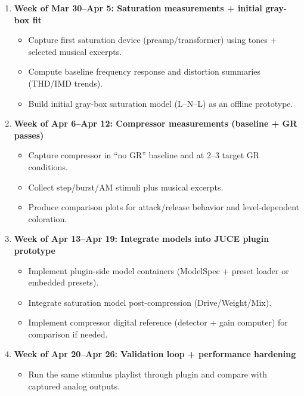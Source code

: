 \documentclass[11pt, letterpaper]{article}
\begin{document}
\begin{enumerate}[leftmargin=1.5em]
\begin{itemize}[leftmargin=1.5em]
              \item Run repeatability checks across multiple takes (same settings, same results within tolerance).
          \end{itemize}
    \item \textbf{Week of Mar 30--Apr 5: Saturation measurements + initial gray-box fit}
          \begin{itemize}[leftmargin=1.5em]
              \item Capture first saturation device (preamp/transformer) using tones + selected musical excerpts.
              \item Compute baseline frequency response and distortion summaries (THD/IMD trends).
              \item Build initial gray-box saturation model (L--N--L) as an offline prototype.
          \end{itemize}
    \item \textbf{Week of Apr 6--Apr 12: Compressor measurements (baseline + GR passes)}
          \begin{itemize}[leftmargin=1.5em]
              \item Capture compressor in ``no GR'' baseline and at 2--3 target GR conditions.
              \item Collect step/burst/AM stimuli plus musical excerpts.
              \item Produce comparison plots for attack/release behavior and level-dependent coloration.
          \end{itemize}
    \item \textbf{Week of Apr 13--Apr 19: Integrate models into JUCE plugin prototype}
          \begin{itemize}[leftmargin=1.5em]
              \item Implement plugin-side model containers (ModelSpec + preset loader or embedded presets).
              \item Integrate saturation model post-compression (Drive/Weight/Mix).
              \item Implement compressor digital reference (detector + gain computer) for comparison if needed.
          \end{itemize}
    \item \textbf{Week of Apr 20--Apr 26: Validation loop + performance hardening}
          \begin{itemize}[leftmargin=1.5em]
              \item Run the same stimulus playlist through plugin and compare with captured analog outputs.

\end{itemize}
\end{enumerate}
\end{document}
